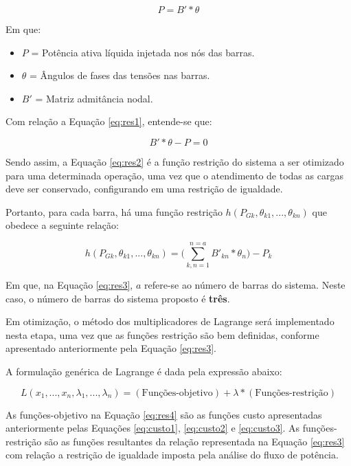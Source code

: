 	\begin{equation}
		P = B'*\theta
		\label{eq:res1}
	\end{equation}
	
	Em que:
	
	\begin{itemize}
		\item $P$ = Potência ativa líquida injetada nos nós das barras.
		\item $\theta$ = Ângulos de fases das tensões nas barras.
		\item $B'$ = Matriz admitância nodal.
	\end{itemize}
	
	Com relação a Equação \ref{eq:res1}, entende-se que:
	
	\begin{equation}
		B'*\theta - P = 0
		\label{eq:res2}
	\end{equation}
	
	Sendo assim, a Equação \ref{eq:res2} é a função restrição do sistema a ser otimizado para uma determinada operação, uma vez que o atendimento de todas as cargas deve ser conservado, configurando em uma restrição de igualdade.
	
	Portanto, para cada barra, há uma função restrição $h(P_{Gk},\theta{_{k1}},...,\theta{_{kn}})$ que obedece a seguinte relação:
	
	\begin{equation} %
		h(P_{Gk},\theta{_{k1}},...,\theta{_{kn}}) = \Bigg(\displaystyle\sum_{k,n=1}^{n=a} B'_{kn}*\theta{_n}\Bigg) - P_k
		\label{eq:res3}
	\end{equation}
	
	Em que, na Equação \ref{eq:res3}, $a$ refere-se ao número de barras do sistema. Neste caso, o número de barras do sistema proposto é \textbf{três}.
	
	Em otimização, o método dos multiplicadores de Lagrange será implementado nesta etapa, uma vez que as funções restrição são bem definidas, conforme apresentado anteriormente pela Equação \ref{eq:res3}.
	
	A formulação genérica de Lagrange é dada pela expressão abaixo:
	
	\begin{equation}
		L(x_1,...,x_n,\lambda{_1},...,\lambda{_n}) = (\text{Funções-objetivo}) + \lambda*(\text{Funções-restrição})
		\label{eq:res4}
 	\end{equation}
 	
 	As funções-objetivo na Equação \ref{eq:res4} são as funções custo apresentadas anteriormente pelas Equações \ref{eq:custo1}, \ref{eq:custo2} e \ref{eq:custo3}. As funções-restrição são as funções resultantes da relação representada na Equação \ref{eq:res3} com relação a restrição de igualdade imposta pela análise do fluxo de potência.
 	
